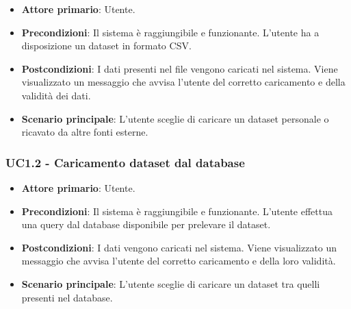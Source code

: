\begin{itemize}
	\item \textbf{Attore primario}: Utente.
	\item \textbf{Precondizioni}: Il sistema è raggiungibile e funzionante. L'utente ha a disposizione un dataset in formato CSV.
	\item \textbf{Postcondizioni}: I dati presenti nel file vengono caricati nel sistema. Viene visualizzato un messaggio che avvisa l'utente del corretto caricamento e della validità dei dati.
	\item \textbf{Scenario principale}: L'utente sceglie di caricare un dataset personale o ricavato da altre fonti esterne.
	
\end{itemize}

\subsubsection{UC1.2 - Caricamento dataset dal database}

\begin{itemize}
	\item \textbf{Attore primario}: Utente.
	\item \textbf{Precondizioni}: Il sistema è raggiungibile e funzionante. L'utente effettua una query dal database disponibile per prelevare il dataset.
	\item \textbf{Postcondizioni}: I dati vengono caricati nel sistema. Viene visualizzato un messaggio che avvisa l'utente del corretto caricamento e della loro validità.
	\item \textbf{Scenario principale}: L'utente sceglie di caricare un dataset tra quelli presenti nel database.
	
\end{itemize}


  